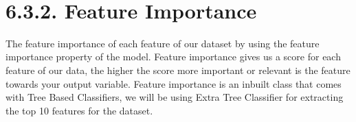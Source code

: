 \documentclass[11pt]{article}
\begin{document}
    \begin{center}
    \end{center}
    { \hspace*{\fill} \\}
    
    \section{6.3.2. Feature Importance}\label{feature-importance}

The feature importance of each feature of our dataset by using the
feature importance property of the model. Feature importance gives us a
score for each feature of our data, the higher the score more important
or relevant is the feature towards your output variable. Feature
importance is an inbuilt class that comes with Tree Based Classifiers,
we will be using Extra Tree Classifier for extracting the top 10
features for the dataset.
\end{document}
